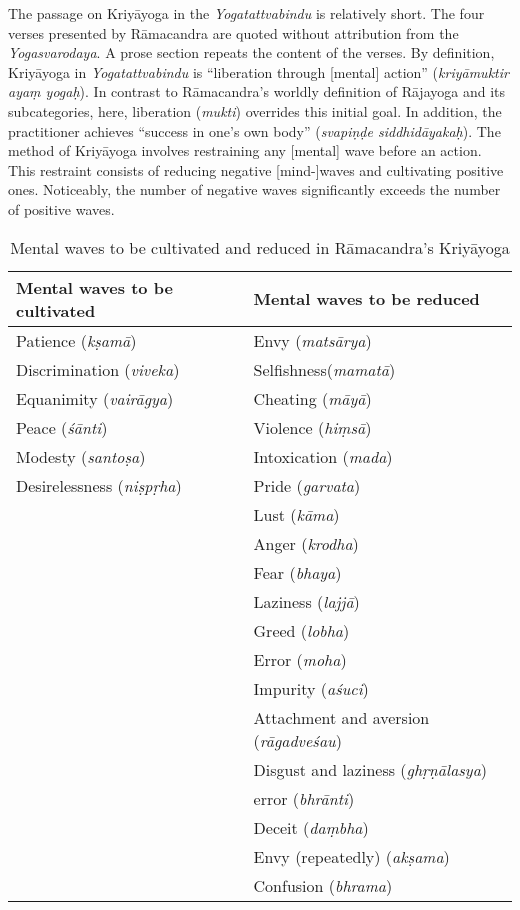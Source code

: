 The passage on Kriyāyoga in the \textit{Yogatattvabindu} is relatively short. The four verses presented by Rāmacandra are quoted without attribution from the \textit{Yogasvarodaya}. A prose section repeats the content of the verses. By definition, Kriyāyoga in \textit{Yogatattvabindu} is ``liberation through [mental] action'' (\textit{kriyāmuktir ayaṃ yogaḥ}). In contrast to Rāmacandra's worldly definition of Rājayoga and its subcategories, here, liberation (\textit{mukti}) overrides this initial goal. In addition, the practitioner achieves ``success in one's own body'' (\textit{svapiṇḍe siddhidāyakaḥ}). The method of Kriyāyoga involves restraining any [mental] wave before an action. This restraint consists of reducing negative [mind-]waves and cultivating positive ones. Noticeably, the number of negative waves significantly exceeds the number of positive waves.

\begin{table}[h]
    \centering
    \begin{tabularx}{\textwidth}{XX}
        \toprule
        \textbf{Mental waves to be cultivated} & \textbf{Mental waves to be reduced} \\
        \midrule
        Patience (\textit{kṣamā}) & Envy (\textit{matsārya}) \\
        Discrimination (\textit{viveka}) & Selfishness(\textit{mamatā})\\
        Equanimity (\textit{vairāgya}) & Cheating (\textit{māyā})\\
        Peace (\textit{śānti}) & Violence (\textit{hiṃsā})\\
        Modesty (\textit{santoṣa}) & Intoxication (\textit{mada})\\
        Desirelessness (\textit{niṣpṛha}) & Pride (\textit{garvata})\\
        & Lust (\textit{kāma}) \\
        & Anger (\textit{krodha}) \\
        & Fear (\textit{bhaya})\\
        & Laziness (\textit{lajjā})\\
        & Greed (\textit{lobha})\\
        & Error (\textit{moha})\\
        & Impurity (\textit{aśuci})\\
        & Attachment and aversion (\textit{rāgadveśau}) \\
        & Disgust and laziness (\textit{ghṛṇālasya})\\
        & error (\textit{bhrānti})\\
        & Deceit (\textit{daṃbha})\\
        & Envy (repeatedly) (\textit{akṣama})\\
        & Confusion (\textit{bhrama})\\
        \bottomrule
    \end{tabularx}
    \caption{Mental waves to be cultivated and reduced in Rāmacandra's Kriyāyoga}
    \label{tab:waves}
\end{table}

